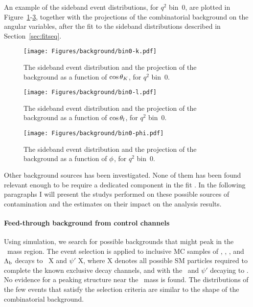 An example of the sideband event distributions, for $q^2$ bin~0, are plotted in Figure~\ref{fig:bin0-bkg-k}-\ref{fig:bin0-bkg-phi}, together with the projections of the combinatorial background \pdf on the angular variables, after the fit to the sideband distributions described in Section~\ref{sec:fitseq}.

\begin{figure}[!hbt]
  \centering
  \texttt{[image: Figures/background/bin0-k.pdf]}
  \caption{The sideband event distribution and the projection of the background \pdf as a function of $\cos\theta_K$, for $q^2$ bin~0.}
  \label{fig:bin0-bkg-k}
\end{figure}

\begin{figure}[!hbt]
  \centering
  \texttt{[image: Figures/background/bin0-l.pdf]}
  \caption{The sideband event distribution and the projection of the background \pdf as a function of $\cos\theta_l$, for $q^2$ bin~0.}
  \label{fig:bin0-bkg-l}
\end{figure}

\begin{figure}[!hbt]
  \centering
  \texttt{[image: Figures/background/bin0-phi.pdf]}
  \caption{The sideband event distribution and the projection of the background \pdf as a function of $\phi$, for $q^2$ bin~0.}
  \label{fig:bin0-bkg-phi}
\end{figure}

Other background sources has been investigated.
None of them has been found relevant enough to be require a dedicated component in the fit \pdf.
In the following paragraphs I will present the studys performed on these possible sources of contamination and the estimates on their impact on the analysis results.

\paragraph{Feed-through background from control channels}
\label{sec:feedThroughBkg}



Using simulation, we search for possible backgrounds that might peak in the \PBz\ mass region.
The event selection is applied to inclusive MC samples of \PBz, \PBs, \PBp, and $\Lambda_{\rm b}$ decays to \cPJgy\ X and $\psi'$ X, where X denotes all possible SM particles required to complete the known exclusive decay channels, and with the \cPJgy\ and $\psi'$ decaying to \Pgmp \Pgmm.
No evidence for a peaking structure near the \PBz\ mass is found.
The distributions of the few events that satisfy the selection criteria are similar to the shape of the combinatorial background.

